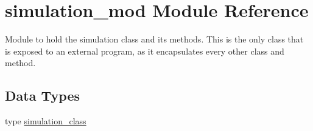 \hypertarget{namespacesimulation__mod}{}\section{simulation\+\_\+mod Module Reference}
\label{namespacesimulation__mod}


Module to hold the simulation class and its methods. This is the only class that is exposed to an external program, as it encapsulates every other class and method.  


\subsection*{Data Types}
\begin{DoxyCompactItemize}
\item 
type \mbox{\hyperlink{structsimulation__mod_1_1simulation__class}{simulation\+\_\+class}}
\end{DoxyCompactItemize}
